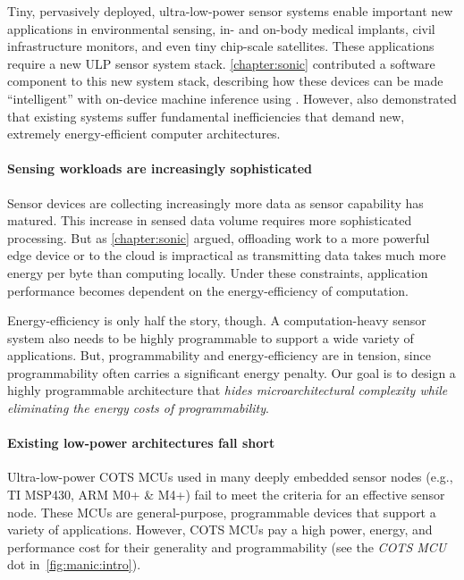 Tiny, pervasively deployed, ultra-low-power sensor systems
enable important new applications in environmental sensing, in- and on-body
medical implants, civil infrastructure monitors, and even tiny chip-scale
satellites.
% 
These applications require a new ULP sensor system stack.
% 
\autoref{chapter:sonic} contributed a software component to this new system stack, describing how these devices can be made ``intelligent'' with on-device machine inference using \sonic.
% 
However, \sonic also demonstrated that existing systems suffer fundamental
inefficiencies that demand new, extremely energy-efficient computer
architectures. 

\paragraph{Sensing workloads are increasingly sophisticated} 
Sensor devices are collecting increasingly more data as sensor capability has matured.
% 
This increase in sensed data volume requires more sophisticated processing.
% 
But as \autoref{chapter:sonic} argued, offloading work to a more powerful edge device or to the cloud is impractical as transmitting data takes much more energy per byte than computing locally.
%
Under these constraints, application performance becomes dependent on the energy-efficiency of computation.
%

Energy-efficiency is only half the story, though.
% 
A computation-heavy sensor system also needs to be highly programmable to support a wide variety of applications.
% 
But, programmability and energy-efficiency are in tension, since programmability often carries a significant energy penalty.
% 
Our goal is to design a highly programmable architecture that \emph{hides microarchitectural complexity while eliminating the energy costs of programmability}.

\paragraph{Existing low-power architectures fall short}
Ultra-low-power COTS MCUs used in many deeply embedded sensor nodes
(e.g., TI MSP430, ARM M0+ \& M4+) fail
to meet the criteria for an effective sensor node.
%
These MCUs are general-purpose, programmable devices that support a variety of
applications.  
%
However, COTS MCUs pay a high power, energy, and performance cost for their
generality and programmability (see the \textit{COTS MCU} dot in~\autoref{fig:manic:intro}).  
%

